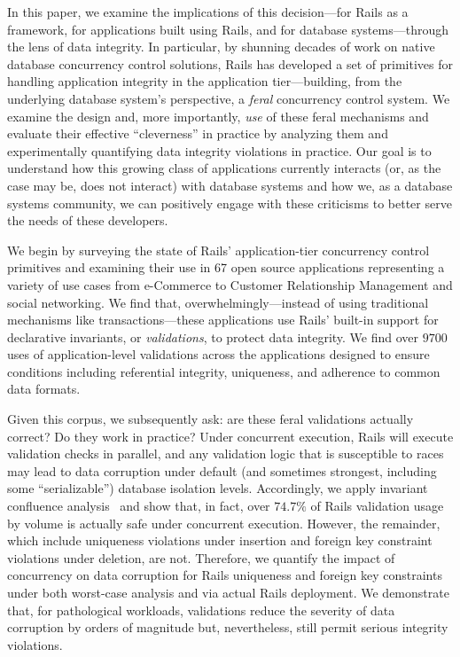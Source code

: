 In this paper, we examine the implications of this decision---for
Rails as a framework, for applications built using Rails, and for
database systems---through the lens of data integrity. In particular,
by shunning decades of work on native database concurrency control
solutions, Rails has developed a set of primitives for handling
application integrity in the application tier---building, from the
underlying database system's perspective, a \textit{feral} concurrency
control system. We examine the design and, more importantly,
\textit{use} of these feral mechanisms and evaluate their effective
``cleverness'' in practice by analyzing them and experimentally
quantifying data integrity violations in practice. Our goal is to
understand how this growing class of applications currently interacts
(or, as the case may be, does not interact) with database systems and
how we, as a database systems community, we can positively engage with
these criticisms to better serve the needs of these developers.

We begin by surveying the state of Rails' application-tier concurrency
control primitives and examining their use in 67 open source
applications representing a variety of use cases from e-Commerce to
Customer Relationship Management and social networking. We find that,
overwhelmingly---instead of using traditional mechanisms like
transactions---these applications use Rails' built-in support for
declarative invariants, or \textit{validations}, to protect data
integrity. We find over $9700$ uses of application-level validations
across the applications designed to ensure conditions including
referential integrity, uniqueness, and adherence to common data
formats.

Given this corpus, we subsequently ask: are these feral validations
actually correct? Do they work in practice? Under concurrent
execution, Rails will execute validation checks in parallel, and any
validation logic that is susceptible to races may lead to data
corruption under default (and sometimes strongest, including some
``serializable'') database isolation levels. Accordingly, we apply
invariant confluence analysis~\cite{coord-avoid} and show that, in
fact, over $74.7\%$ of Rails validation usage by volume is actually
safe under concurrent execution. However, the remainder, which include
uniqueness violations under insertion and foreign key constraint
violations under deletion, are not. Therefore, we quantify the impact
of concurrency on data corruption for Rails uniqueness and foreign key
constraints under both worst-case analysis and via actual Rails
deployment. We demonstrate that, for pathological workloads,
validations reduce the severity of data corruption by orders of
magnitude but, nevertheless, still permit serious integrity violations.

